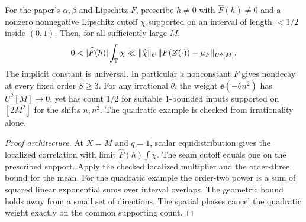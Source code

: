 \begin{lemma}\label{checked-ambient-norm}
\leanok
For the paper's $\alpha,\beta$ and Lipschitz $F$, prescribe
$h\ne0$ with $\widehat F(h)\ne0$ and a nonzero nonnegative
Lipschitz cutoff $\chi$ supported on an interval of length $<1/2$
inside $(0,1)$. Then, for all sufficiently large $M$,
\[
 0<|\widehat F(h)|\int_{\T}\chi
 \ll \norm{\widehat\chi}_{\ell^1}\norm{F(Z(\cdot))-\mu_F}_{U^3[M]}.
\]
The implicit constant is universal. In particular a nonconstant
$F$ gives nondecay at every fixed order $S\ge3$.
For any irrational $\theta$, the weight $\ee(-\theta n^2)$
has $U^2[M]\to0$, yet has count $1/2$ for suitable $1$-bounded
inputs supported on $[2M^2]$ for the shifts $n,n^2$.
The quadratic example is checked from irrationality alone.
\end{lemma}
\begin{proof}[Proof architecture]
\leanok
At $X=M$ and $q=1$, scalar equidistribution gives the localized
correlation with limit $\widehat F(h)\int\chi$. The seam cutoff
equals one on the prescribed support. Apply the checked localized
multiplier and the order-three bound for the mean. For the quadratic example the
order-two power is a sum of squared linear exponential sums
over interval overlaps. The geometric bound holds away from a
small set of directions. The spatial phases cancel the quadratic
weight exactly on the common supporting count.
\end{proof}

